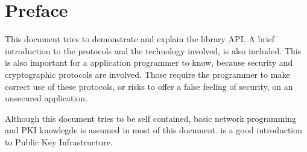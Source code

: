 \chapter{Preface}

This document tries to demonstrate and explain the \gnutls{} library API.
A brief introduction to the protocols and the technology involved, is
also included. This is also important for a \tls{} application programmer
to know, because security and cryptographic protocols are involved. 
Those require the programmer
to make correct use of these protocols, or risks to offer a false feeling
of security, on an unsecured application.

Although this document tries to be self contained, basic 
network programming and PKI knowlegde is assumed in most of this document. 
\cite{GUTPKI} is a good introduction to Public Key Infrastructure.
